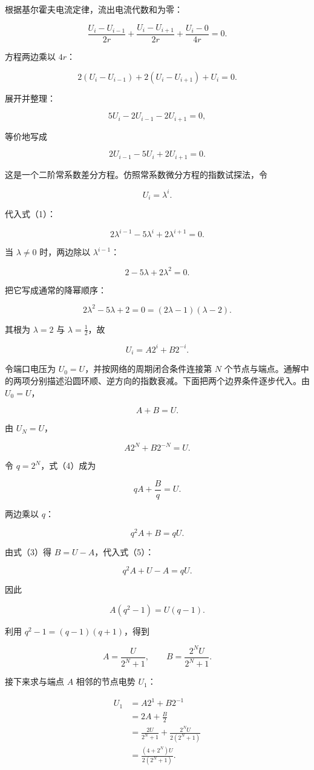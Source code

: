 \documentclass[12pt,a4paper,UTF8]{ctexart}
\begin{document}
根据基尔霍夫电流定律，流出电流代数和为零：

\[\frac{U_i-U_{i-1}}{2r}
+\frac{U_i-U_{i+1}}{2r}
+\frac{U_i-0}{4r}=0.\]

方程两边乘以 \(4r\)：

\[2(U_i-U_{i-1})+2(U_i-U_{i+1})+U_i=0.\]

展开并整理：

\[5U_i-2U_{i-1}-2U_{i+1}=0,\]

等价地写成

\[2U_{i-1}-5U_i+2U_{i+1}=0. \tag{1}\]

这是一个二阶常系数差分方程。仿照常系数微分方程的指数试探法，令

\[U_i=\lambda^i.\]

代入式（1）：

\[2\lambda^{i-1}-5\lambda^i+2\lambda^{i+1}=0.\]

当 \(\lambda\neq0\) 时，两边除以 \(\lambda^{i-1}\)：

\[2-5\lambda+2\lambda^2=0.\]

把它写成通常的降幂顺序：

\[2\lambda^2-5\lambda+2=0
=(2\lambda-1)(\lambda-2).\]

其根为 \(\lambda=2\) 与 \(\lambda=\frac12\)，故

\[U_i=A2^i+B2^{-i}. \tag{2}\]

令端口电压为 \(U_0=U\)，并按网络的周期闭合条件连接第 \(N\)
个节点与端点。通解中的两项分别描述沿圆环顺、逆方向的指数衰减。下面把两个边界条件逐步代入。由
\(U_0=U\)，

\[A+B=U. \tag{3}\]

由 \(U_N=U\)，

\[A2^N+B2^{-N}=U. \tag{4}\]

令 \(q=2^N\)，式（4）成为

\[qA+\frac Bq=U.\]

两边乘以 \(q\)：

\[q^2A+B=qU. \tag{5}\]

由式（3）得 \(B=U-A\)，代入式（5）：

\[q^2A+U-A=qU.\]

因此

\[A(q^2-1)=U(q-1).\]

利用 \(q^2-1=(q-1)(q+1)\)，得到

\[A=\frac{U}{2^N+1},\qquad
B=\frac{2^NU}{2^N+1}.\]

接下来求与端点 \(A\) 相邻的节点电势 \(U_1\)：

\[\begin{aligned}
U_1
&=A2^1+B2^{-1}\\
&=2A+\frac B2\\
&=\frac{2U}{2^N+1}
+\frac{2^NU}{2(2^N+1)}\\
&=\frac{(4+2^N)U}{2(2^N+1)}.
\end{aligned}\]
\end{document}
